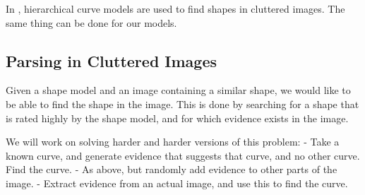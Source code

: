 
In \cite{hcm}, hierarchical curve models are used to find shapes in
cluttered images. The same thing can be done for our models.


\subsection{Parsing in Cluttered Images}
Given a shape model and an image containing a similar shape, we would
like to be able to find the shape in the image. This is done by
searching for a shape that is rated highly by the shape model, and for
which evidence exists in the image.

We will work on solving harder and harder versions of this problem:
  - Take a known curve, and generate evidence that suggests that
    curve, and no other curve. Find the curve.
  - As above, but randomly add evidence to other parts of the image.
  - Extract evidence from an actual image, and use this to find the
    curve.


